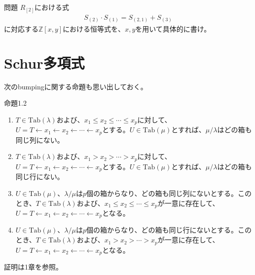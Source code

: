 \documentclass[a4paper,11pt]{jsarticle}
\theoremstyle{plain}
\theoremstyle{definition}
\renewcommand{\(}{\left(}
\renewcommand{\)}{\right)}
\renewcommand{\[}{\left[}
\renewcommand{\]}{\right]}
\renewcommand{\{}{\left\lbrace}
\renewcommand{\}}{\right\rbrace}
\newcommand{\Z}{\mathbb{Z}}
\begin{document}
\begin{itembox}[l]{問題}
    $R_{[2]}$における式
    \begin{align*}
        S_{(2)} \cdot S_{(1)} = S_{(2,1)} + S_{(3)}
    \end{align*}
    に対応する$\Z[x,y]$における恒等式を、$x,y$を用いて具体的に書け。
\end{itembox}




\newpage

\section{Schur多項式}

次のbumpingに関する命題も思い出しておく。
\begin{itembox}[l]{命題1.2}
    \begin{enumerate}
        \item $T \in \text{Tab}(\lambda)$および、$x_1 \leq x_2 \leq \cdots \leq x_p$に対して、
        $U = T \leftarrow x_1 \leftarrow x_2 \leftarrow \cdots \leftarrow x_p$とする。$U \in \text{Tab}(\mu)$とすれば、$\mu / \lambda$はどの箱も同じ列にない。
        \item $T \in \text{Tab}(\lambda)$および、$x_1 > x_2 > \cdots > x_p$に対して、
        $U = T \leftarrow x_1 \leftarrow x_2 \leftarrow \cdots \leftarrow x_p$とする。$U \in \text{Tab}(\mu)$とすれば、$\mu / \lambda$はどの箱も同じ行にない。
        \item $U \in \text{Tab}(\mu)$、$\lambda/\mu$は$p$個の箱からなり、どの箱も同じ列にないとする。このとき、$T \in \text{Tab}(\lambda)$および、$x_1 \leq x_2 \leq \cdots \leq x_p$が一意に存在して、
        $U = T \leftarrow x_1 \leftarrow x_2 \leftarrow \cdots \leftarrow x_p$となる。
        \item $U \in \text{Tab}(\mu)$、$\lambda/\mu$は$p$個の箱からなり、どの箱も同じ行にないとする。このとき、$T \in \text{Tab}(\lambda)$および、$x_1 > x_2 > \cdots > x_p$が一意に存在して、
        $U = T \leftarrow x_1 \leftarrow x_2 \leftarrow \cdots \leftarrow x_p$となる。
    \end{enumerate}
\end{itembox}

証明は1章を参照。
\end{document}
